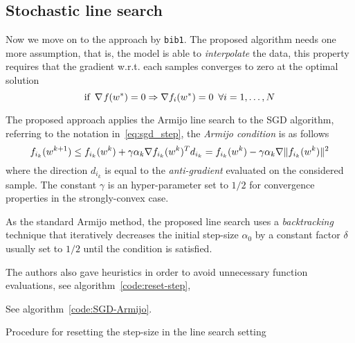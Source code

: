 \subsection{Stochastic line search}

Now we move on to the approach by \texttt{bib1}. The proposed algorithm needs one more assumption, that is, the model is able to \emph{interpolate} the data, this property requires that the gradient w.r.t. each samples converges to zero at the optimal solution
\[
\text{if}\,\,\,\nabla\operatorname*{\mathit{f}}(w^\ast)=0\Rightarrow\nabla f_i(w^\ast)=0\,\,\,\forall i=1,\dots,N
\]

The proposed approach applies the Armijo line search to the SGD algorithm, referring to the notation in~\eqref{eq:sgd_step}, the \emph{Armijo condition} is as follows
\[
f_{i_k}(w^{k+1})\leq f_{i_k}(w^k)+\gamma\alpha_k\nabla f_{i_k}(w^k)^Td_{i_k}=f_{i_k}(w^k)-\gamma\alpha_k\nabla\lVert f_{i_k}(w^k)\rVert^2
\]
where the direction $d_{i_k}$ is equal to the \emph{anti-gradient} evaluated on the considered sample. The constant $\gamma$ is an hyper-parameter set to $1/2$ for convergence properties in the strongly-convex case.

As the standard Armijo method, the proposed line search uses a \emph{backtracking} technique that iteratively decreases the initial step-size $\alpha_0$ by a constant factor $\delta$ usually set to $1/2$ until the condition is satisfied.

The authors also gave heuristics in order to avoid unnecessary function evaluations, see algorithm~\vref{code:reset-step}, 


See algorithm~\vref{code:SGD-Armijo}.


\begin{algorithm}
\caption{Procedure for resetting the step-size in the line search setting}\label{code:reset-step}
\KwRet{$\alpha$}
\end{algorithm}

